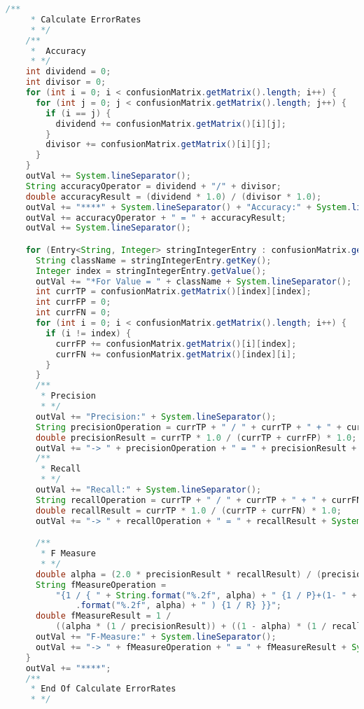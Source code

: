 \begin{lstlisting}[language=Java,basicstyle=\tiny,caption=TestingReducer.java]
    /**
     * Calculate ErrorRates
     * */
    /**
     *  Accuracy
     * */
    int dividend = 0;
    int divisor = 0;
    for (int i = 0; i < confusionMatrix.getMatrix().length; i++) {
      for (int j = 0; j < confusionMatrix.getMatrix().length; j++) {
        if (i == j) {
          dividend += confusionMatrix.getMatrix()[i][j];
        }
        divisor += confusionMatrix.getMatrix()[i][j];
      }
    }
    outVal += System.lineSeparator();
    String accuracyOperator = dividend + "/" + divisor;
    double accuracyResult = (dividend * 1.0) / (divisor * 1.0);
    outVal += "****" + System.lineSeparator() + "Accuracy:" + System.lineSeparator();
    outVal += accuracyOperator + " = " + accuracyResult;
    outVal += System.lineSeparator();

    for (Entry<String, Integer> stringIntegerEntry : confusionMatrix.getInfo().entrySet()) {
      String className = stringIntegerEntry.getKey();
      Integer index = stringIntegerEntry.getValue();
      outVal += "*For Value = " + className + System.lineSeparator();
      int currTP = confusionMatrix.getMatrix()[index][index];
      int currFP = 0;
      int currFN = 0;
      for (int i = 0; i < confusionMatrix.getMatrix().length; i++) {
        if (i != index) {
          currFP += confusionMatrix.getMatrix()[i][index];
          currFN += confusionMatrix.getMatrix()[index][i];
        }
      }
      /**
       * Precision
       * */
      outVal += "Precision:" + System.lineSeparator();
      String precisionOperation = currTP + " / " + currTP + " + " + currFP;
      double precisionResult = currTP * 1.0 / (currTP + currFP) * 1.0;
      outVal += "-> " + precisionOperation + " = " + precisionResult + System.lineSeparator();
      /**
       * Recall
       * */
      outVal += "Recall:" + System.lineSeparator();
      String recallOperation = currTP + " / " + currTP + " + " + currFN;
      double recallResult = currTP * 1.0 / (currTP + currFN) * 1.0;
      outVal += "-> " + recallOperation + " = " + recallResult + System.lineSeparator();

      /**
       * F Measure
       * */
      double alpha = (2.0 * precisionResult * recallResult) / (precisionResult + recallResult);
      String fMeasureOperation =
          "{1 / { " + String.format("%.2f", alpha) + " {1 / P}+(1- " + String
              .format("%.2f", alpha) + " ) {1 / R} }}";
      double fMeasureResult = 1 /
          ((alpha * (1 / precisionResult)) + ((1 - alpha) * (1 / recallResult)));
      outVal += "F-Measure:" + System.lineSeparator();
      outVal += "-> " + fMeasureOperation + " = " + fMeasureResult + System.lineSeparator();
    }
    outVal += "****";
    /**
     * End Of Calculate ErrorRates
     * */


\end{lstlisting}
